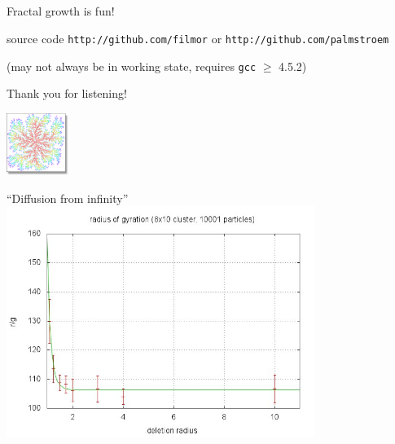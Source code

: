 \documentclass[smaller]{beamer}
\begin{document}
        \subsection*{}
            \begin{frame}{Fractal growth is fun!}
                \begin{center}
                    \begin{block}{source code}
                        \texttt{http://github.com/filmor} or \texttt{http://github.com/palmstroem}
                    \end{block}
    
                    \color{gray}
                    (may not always be in working state, requires \texttt{gcc} $\ge$ 4.5.2)
    
                    \vspace{.5cm}\color{black}
                    Thank you for listening!

                    \vspace{.5cm}
                    \includegraphics[width=2cm]{img/intro_05.png}
                \end{center}
            \end{frame}

    \appendix
        \begin{frame}{``Diffusion from infinity''}
            \includegraphics[width=10cm]{img/app_01.jpg}
        \end{frame}
\end{document}
